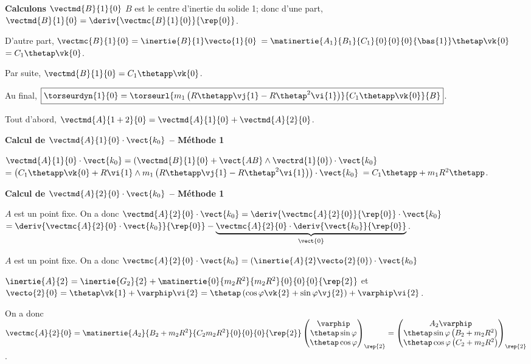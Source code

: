 \textbf{Calculons $\vectmd{B}{1}{0}$}
$B$ est le centre d'inertie du solide 1; donc 
 d'une part, $\vectmd{B}{1}{0} = \deriv{\vectmc{B}{1}{0} }{\rep{0}}$.
 
 D'autre part, $\vectmc{B}{1}{0} = \inertie{B}{1}\vecto{1}{0}$
 $ =\matinertie{A_1}{B_1}{C_1}{0}{0}{0}{\bas{1}} \thetap \vk{0}$
  $ =C_1 \thetap \vk{0}$.
  
  Par suite, $\vectmd{B}{1}{0} = C_1 \thetapp \vk{0}$.
  
  Au final, 
$\boxed{\torseurdyn{1}{0} = \torseurl{m_1\left(R\thetapp \vj{1}-R\thetap^2 \vi{1}\right)}{C_1 \thetapp \vk{0}}{B}}$.


%


\else
\fi

\ifprof

Tout d'abord, $\vectmd{A}{1+2}{0} = \vectmd{A}{1}{0}+\vectmd{A}{2}{0}$.

\textbf{Calcul de $\vectmd{A}{1}{0} \cdot \vect{k_0}$ -- Méthode 1}

$\vectmd{A}{1}{0} \cdot \vect{k_0} = \left(\vectmd{B}{1}{0} + \vect{AB} \wedge \vectrd{1}{0} \right) \cdot \vect{k_0} $
$= \left(C_1 \thetapp \vk{0} + R\vi{1} \wedge m_1\left(R\thetapp \vj{1}-R\thetap^2 \vi{1}\right) \right) \cdot \vect{k_0} $
$= C_1 \thetapp  +  m_1R^2 \thetapp  $.


\textbf{Calcul de $\vectmd{A}{2}{0} \cdot \vect{k_0}$ -- Méthode 1}

$A$ est un point fixe. On a donc 
$\vectmd{A}{2}{0} \cdot \vect{k_0} = \deriv{\vectmc{A}{2}{0}}{\rep{0}}\cdot \vect{k_0} $
$= \deriv{\vectmc{A}{2}{0}\cdot \vect{k_0}}{\rep{0}} - \underbrace{\vectmc{A}{2}{0}\cdot \deriv{ \vect{k_0}}{\rep{0}}}_{\vect{0}}$.

$A$ est un point fixe. On a donc 
$\vectmc{A}{2}{0} \cdot \vect{k_0} = \left(\inertie{A}{2} \vecto{2}{0}\right)\cdot \vect{k_0} $

$\inertie{A}{2} = \inertie{G_2}{2}+\matinertie{0}{m_2R^2}{m_2R^2}{0}{0}{0}{\rep{2}}$ et
$\vecto{2}{0} = \thetap\vk{1}+\varphip\vi{2}=\thetap\left(\cos\varphi\vk{2}+\sin\varphi\vj{2}\right)+\varphip\vi{2}$. 

On a donc $\vectmc{A}{2}{0}= \matinertie{A_2}{B_2+m_2R^2}{C_2m_2R^2}{0}{0}{0}{\rep{2}}\begin{pmatrix}
\varphip \\
\thetap\sin\varphi \\
\thetap\cos\varphi
\end{pmatrix}_{\rep{2}}
= \begin{pmatrix}
A_2 \varphip \\
\thetap\sin\varphi \left(B_2+m_2R^2\right) \\
\thetap\cos\varphi\left(C_2+m_2R^2\right)
\end{pmatrix}_{\rep{2}}
$. 

